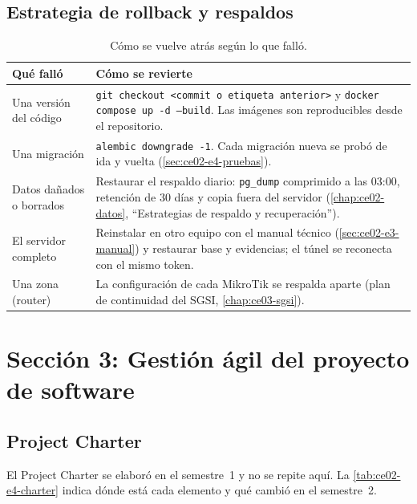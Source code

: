 \subsection{Estrategia de rollback y respaldos}
\label{sec:ce02-e4-rollback}

\begin{table}[H]
\centering
\caption{Cómo se vuelve atrás según lo que falló.}
\label{tab:ce02-e4-rollback}
\small
\begin{tabularx}{\textwidth}{L{3cm}X}
\toprule
\textbf{Qué falló} & \textbf{Cómo se revierte} \\
\midrule
Una versión del código & \texttt{git checkout <commit o etiqueta anterior>} y \texttt{docker compose up -d --build}. Las imágenes son reproducibles desde el repositorio. \\
Una migración & \texttt{alembic downgrade -1}. Cada migración nueva se probó de ida y vuelta (\cref{sec:ce02-e4-pruebas}). \\
Datos dañados o borrados & Restaurar el respaldo diario: \texttt{pg\_dump} comprimido a las 03:00, retención de 30 días y copia fuera del servidor (\cref{chap:ce02-datos}, ``Estrategias de respaldo y recuperación''). \\
El servidor completo & Reinstalar en otro equipo con el manual técnico (\cref{sec:ce02-e3-manual}) y restaurar base y evidencias; el túnel se reconecta con el mismo token. \\
Una zona (router) & La configuración de cada MikroTik se respalda aparte (plan de continuidad del SGSI, \cref{chap:ce03-sgsi}). \\
\bottomrule
\end{tabularx}
\end{table}

\section{Sección 3: Gestión ágil del proyecto de software}
\label{sec:ce02-e4-agil}

\subsection{Project Charter}

El Project Charter se elaboró en el semestre~1 y no se repite aquí. La
\cref{tab:ce02-e4-charter} indica dónde está cada elemento y qué cambió en el semestre~2.

